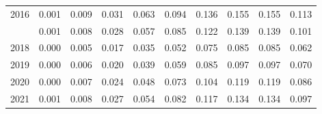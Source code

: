 \documentclass[
]{article}
\begin{document}
\begin{longtable}[t]{lrrrrrrrrr}
2016 & 0.001 & 0.009 & 0.031 & 0.063 & 0.094 & 0.136 & 0.155 & 0.155 & 0.113\\
\addlinespace
2017 & 0.001 & 0.008 & 0.028 & 0.057 & 0.085 & 0.122 & 0.139 & 0.139 & 0.101\\
2018 & 0.000 & 0.005 & 0.017 & 0.035 & 0.052 & 0.075 & 0.085 & 0.085 & 0.062\\
2019 & 0.000 & 0.006 & 0.020 & 0.039 & 0.059 & 0.085 & 0.097 & 0.097 & 0.070\\
2020 & 0.000 & 0.007 & 0.024 & 0.048 & 0.073 & 0.104 & 0.119 & 0.119 & 0.086\\
2021 & 0.001 & 0.008 & 0.027 & 0.054 & 0.082 & 0.117 & 0.134 & 0.134 & 0.097\\*
\end{longtable}
\end{document}
